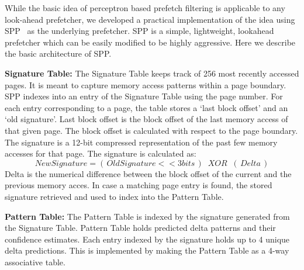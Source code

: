 While the basic idea of perceptron based prefetch filtering is applicable to
any look-ahead prefetcher, we developed a practical implementation of the idea
using SPP~\cite{SPP} as the underlying prefetcher.  SPP is a simple,
lightweight, lookahead prefetcher which can be easily modified to be highly
aggressive.  Here we describe the basic architecture of SPP.


\textbf{Signature Table:} The Signature Table keeps track of 256 most recently accessed
pages.  It is meant to capture memory access patterns within a page
boundary.  SPP indexes into an entry of the Signature Table using the page number.  For
each entry corresponding to a page, the table stores a `last block offset'
and an `old signature'.  Last block offset is the block offset of the
last memory access of that given page.  The block offset is calculated
with respect to the page boundary.  The signature is a 12-bit
compressed representation of the past few memory accesses for that
page.  The signature is calculated as:
$$New Signature = (\,Old Signature << 3 bits\,) \;\;XOR\;\; (\,Delta\,)$$ 
Delta is the numerical difference between the block offset of the 
current and the previous memory acces. In case a matching page entry 
is found, the stored signature retrieved and used to index into the 
Pattern Table.

\textbf{Pattern Table:} The Pattern Table is indexed by the signature generated
from the Signature Table.  Pattern Table holds predicted delta patterns and their confidence
estimates.  Each entry indexed by the signature holds up to 4 unique
delta predictions.  This is implemented by making the Pattern Table as a 4-way
associative table.



